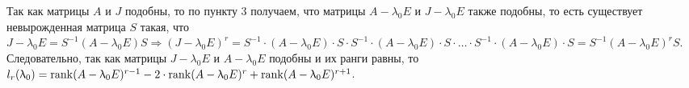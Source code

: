 \begin{Proof}
\begin{enumerate}
		Так как матрицы $A$ и $J$ подобны, то по пункту 3 получаем, что матрицы $A-\lambda_0 E$ и $J - \lambda_0 E$ также подобны, то есть существует невырожденная матрица $S$ такая, что $J-\lambda_0 E = S^{-1}(A - \lambda_0 E) S\Rightarrow (J-\lambda_0 E)^r = S^{-1}\cdot (A-\lambda_0 E)\cdot S \cdot S^{-1}\cdot (A-\lambda_0 E)\cdot S\cdot \ldots \cdot S^{-1}\cdot (A-\lambda_0 E)\cdot S = S^{-1} (A-\lambda_0 E)^r S$. Следовательно, так как матрицы $J - \lambda_0 E$ и $A - \lambda_0 E$ подобны и их ранги равны, то $l_r(\uplambda_0) = \operatorname{rank} (A - \uplambda_0 E)^{r - 1} - 2\cdot \operatorname{rank} (A - \uplambda_0 E)^{r} + \operatorname{rank} (A - \uplambda_0 E)^{r + 1}$.
	\end{enumerate}
\end{Proof}







